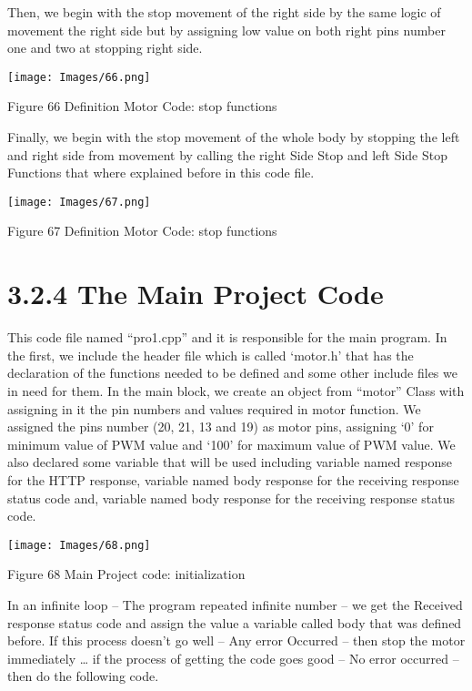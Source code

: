 \documentclass{article}
\begin{document}
Then, we begin with the stop movement of the right side by the same logic of movement the right side but by assigning low value on both right pins number one and two at stopping right side.

\begin{center}
    \texttt{[image: Images/66.png]}

    Figure 66 Definition Motor Code: stop functions
\end{center}

Finally, we begin with the stop movement of the whole body by stopping the left and right side from movement by calling the right Side Stop and left Side Stop Functions that where explained before in this code file.

\begin{center}
    \texttt{[image: Images/67.png]}

    Figure 67 Definition Motor Code: stop functions
\end{center}

\section{3.2.4 The Main Project Code}

This code file named “pro1.cpp” and it is responsible for the main program. In the first, we include the header file which is called ‘motor.h’ that has the declaration of the functions needed to be defined and some other include files we in need for them. In the main block, we create an object from “motor” Class with assigning in it the pin numbers and values required in motor function. We assigned the pins number (20, 21, 13 and 19) as motor pins, assigning ‘0’ for minimum value of PWM value and ‘100’ for maximum value of PWM value. We also declared some variable that will be used including variable named response for the HTTP response, variable named body response for the receiving response status code and, variable named body response for the receiving response status code.

\begin{center}
    \texttt{[image: Images/68.png]}

    Figure 68 Main Project code: initialization
\end{center}

In an infinite loop – The program repeated infinite number – we get the Received response status code and assign the value a variable called body that was defined before. If this process doesn’t go well – Any error Occurred – then stop the motor immediately … if the process of getting the code goes good – No error occurred – then do the following code. 
\end{document}
